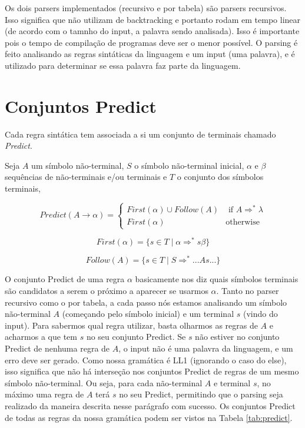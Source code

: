 Os dois parsers implementados (recursivo e por tabela) são parsers recursivos. Isso significa que não utilizam de backtracking e portanto rodam em tempo linear (de acordo com o tamnho do input, a palavra sendo analisada). Isso é importante pois o tempo de compilação de programas deve ser o menor possível. O parsing é feito analisando as regras sintáticas da linguagem e um input (uma palavra), e é utilizado para determinar se essa palavra faz parte da linguagem. 

\section{Conjuntos Predict}
Cada regra sintática tem associada a si um conjunto de terminais chamado \textit{Predict}.

Seja $A$ um símbolo não-terminal, $S$ o símbolo não-terminal inicial, $\alpha$ e $\beta$ sequências de não-terminais e/ou terminais e $T$ o conjunto dos símbolos terminais,

\begin{equation*}
Predict(A\rightarrow \alpha) = 
\begin{cases}
First(\alpha) \cup Follow(A)  & \text{ if } A \Rightarrow^* \lambda  \\
First(\alpha) & \text{otherwise}
\end{cases}
\end{equation*}

\begin{equation*}
First( \alpha) = \{s \in T \mid \alpha \Rightarrow^* s\beta\}
\end{equation*}

\begin{equation*}
Follow(A) = \{s \in T \mid S \Rightarrow^* ...As...\}
\end{equation*}

O conjunto Predict de uma regra $\alpha$ basicamente nos diz quais símbolos terminais são candidatos a serem o próximo a aparecer se usarmos $\alpha$. Tanto no parser recursivo como o por tabela, a cada passo nós estamos analisando um símbolo não-terminal $A$ (começando pelo símbolo inicial) e um terminal $s$ (vindo do input). Para sabermos qual regra utilizar, basta olharmos as regras de $A$ e acharmos a que tem $s$ no seu conjunto Predict. Se $s$ não estiver no conjunto Predict de nenhuma regra de $A$, o input não é uma palavra da linguagem, e um erro deve ser gerado. Como nossa gramática é LL1 (ignorando o caso do else), isso significa que não há interseção nos conjuntos Predict de regras de um mesmo símbolo não-terminal. Ou seja, para cada não-terminal $A$ e terminal $s$, no máximo uma regra de $A$ terá $s$ no seu Predict, permitindo que o parsing seja realizado da maneira descrita nesse parágrafo com sucesso. Os conjuntos Predict de todas as regras da nossa gramática podem ser vistos na Tabela \ref{tab:predict}.

